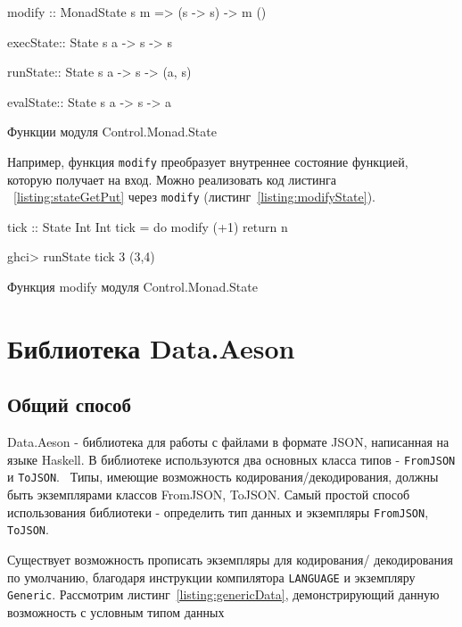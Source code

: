 \begin{ListingEnv}[H]
\begin{Verb}
modify :: MonadState s m => (s -> s) -> m ()

execState:: State s a -> s -> s

runState:: State s a -> s -> (a, s)

evalState:: State s a -> s -> a
\end{Verb}
\caption{Функции модуля Control.Monad.State}
\label{listing:stateFunc}
\end{ListingEnv}

Например, функция \lstinline{modify} преобразует внутреннее состояние функцией, которую получает на вход. Можно реализовать код листинга ~\ref{listing:stateGetPut} через \lstinline{modify} (листинг~\ref{listing:modifyState}).

\begin{ListingEnv}[H]
\begin{Verb}
tick :: State Int Int
tick = do modify (+1)
          return n

ghci> runState tick 3
(3,4)
\end{Verb}
\caption{Функция modify модуля Control.Monad.State}
\label{listing:modifyState}
\end{ListingEnv}
	
\section{Библиотека Data.Aeson}

\subsection{Общий способ}

Data.Aeson - библиотека для работы с файлами в формате JSON, написанная на языке Haskell. В библиотеке используются два основных класса типов - \lstinline{FromJSON} и \lstinline{ToJSON}.~\cite{aesonEx} Типы, имеющие возможность кодирования/декодирования, должны быть экземплярами классов FromJSON, ToJSON. Самый простой способ использования библиотеки - определить тип данных и экземпляры \lstinline{FromJSON}, \lstinline{ToJSON}. 

Существует возможность прописать экземпляры для кодирования/ декодирования по умолчанию, благодаря инструкции компилятора \lstinline{LANGUAGE} и экземпляру \lstinline{Generic}. Рассмотрим листинг~\ref{listing:genericData}, демонстрирующий данную возможность с условным типом данных 


